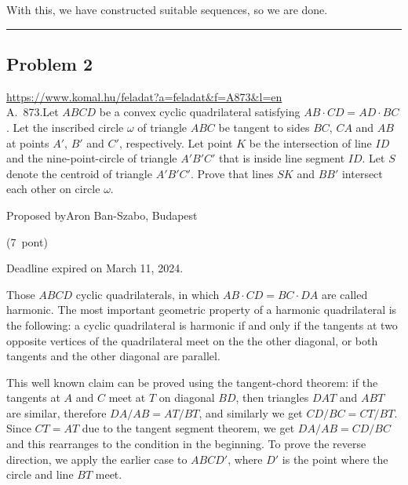 \documentclass{article}
\begin{document}
With this, we have constructed suitable sequences, so we are done.

\vspace{1em}
\hrule
\vspace{1em}

\subsection*{Problem 2}
\noindent\url{https://www.komal.hu/feladat?a=feladat&f=A873&l=en}\\[1em]

A. 873.Let \(\displaystyle ABCD\) be a convex cyclic quadrilateral satisfying \(\displaystyle AB\cdot CD=AD\cdot BC\). Let the inscribed circle \(\displaystyle \omega\) of triangle \(\displaystyle ABC\) be tangent to sides \(\displaystyle BC\), \(\displaystyle CA\) and \(\displaystyle AB\) at points \(\displaystyle A'\), \(\displaystyle B'\) and \(\displaystyle C'\), respectively. Let point \(\displaystyle K\) be the intersection of line \(\displaystyle ID\) and the nine-point-circle of triangle \(\displaystyle A'B'C'\) that is inside line segment \(\displaystyle ID\). Let \(\displaystyle S\) denote the centroid of triangle \(\displaystyle A'B'C'\). Prove that lines \(\displaystyle SK\) and \(\displaystyle BB'\) intersect each other on circle \(\displaystyle \omega\).

Proposed byAron Ban-Szabo, Budapest

(7 pont)

Deadline expired on March 11, 2024.

Those \(\displaystyle ABCD\) cyclic quadrilaterals, in which \(\displaystyle AB\cdot CD = BC \cdot DA\) are called harmonic. The most important geometric property of a harmonic quadrilateral is the following: a cyclic quadrilateral is harmonic if and only if the tangents at two opposite vertices of the quadrilateral meet on the the other diagonal, or both tangents and the other diagonal are parallel.

This well known claim can be proved using the tangent-chord theorem: if the tangents at \(\displaystyle A\) and \(\displaystyle C\) meet at \(\displaystyle T\) on diagonal \(\displaystyle BD\), then triangles \(\displaystyle DAT\) and \(\displaystyle ABT\) are similar, therefore \(\displaystyle DA/AB=AT/BT\), and similarly we get \(\displaystyle CD/BC=CT/BT\). Since \(\displaystyle CT=AT\) due to the tangent segment theorem, we get \(\displaystyle DA/AB=CD/BC\) and this rearranges to the condition in the beginning. To prove the reverse direction, we apply the earlier case to \(\displaystyle ABCD'\), where \(\displaystyle D'\) is the point where the circle and line \(\displaystyle BT\) meet.
\end{document}

